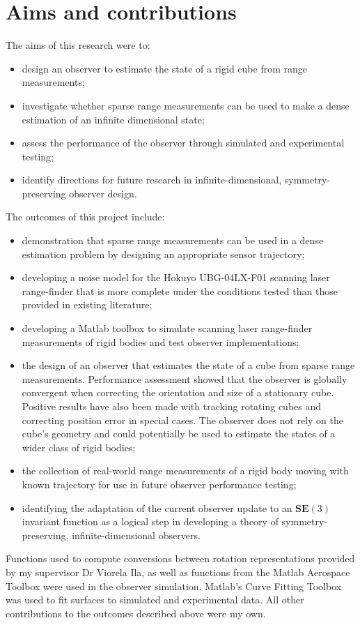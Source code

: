\chapter*{Aims and contributions}

The aims of this research were to:
\begin{itemize}
\item design an observer to estimate the state of a rigid cube from range measurements;
\item investigate whether sparse range measurements can be used to make a dense estimation of an infinite dimensional state;
\item assess the performance of the observer through simulated and experimental testing; 
\item identify directions for future research in infinite-dimensional, symmetry-preserving observer design.
\end{itemize}

The outcomes of this project include:
\begin{itemize}
\item demonstration that sparse range measurements can be used in a dense estimation problem by designing an appropriate sensor trajectory;
\item developing a noise model for the Hokuyo UBG-04LX-F01 scanning laser range-finder that is more complete under the conditions tested than those provided in existing literature;
\item developing a Matlab toolbox to simulate scanning laser range-finder measurements of rigid bodies and test observer implementations;
\item the design of an observer that estimates the state of a cube from sparse range measurements. Performance assessment showed that the observer is globally convergent when correcting the orientation and size of a stationary cube. Positive results have also been made with tracking rotating cubes and correcting position error in special cases. The observer does not rely on the cube's geometry and could potentially be used to estimate the states of a wider class of rigid bodies;
\item the collection of real-world range measurements of a rigid body moving with known trajectory for use in future observer performance testing;
\item identifying the adaptation of the current observer update to an $\mathbf{SE}(3)$ invariant function as a logical step in developing a theory of symmetry-preserving, infinite-dimensional observers.
\end{itemize}

Functions used to compute conversions between rotation representations provided by my supervisor Dr Viorela Ila, as well as functions from the Matlab Aerospace Toolbox were used in the observer simulation. Matlab's Curve Fitting Toolbox was used to fit surfaces to simulated and experimental data.
All other contributions to the outcomes described above were my own.